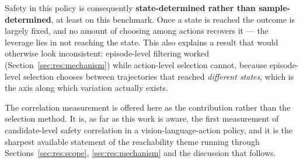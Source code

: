 Safety in this policy is consequently \textbf{state-determined rather than sample-determined}, at
least on this benchmark. Once a state is reached the outcome is largely fixed, and no amount of
choosing among actions recovers it --- the leverage lies in not reaching the state. This also
explains a result that would otherwise look inconsistent: episode-level filtering worked
(Section~\ref{sec:res:mechanism}) while action-level selection cannot, because episode-level
selection chooses between trajectories that reached \emph{different states}, which is the axis
along which variation actually exists.

The correlation measurement is offered here as the contribution rather than the selection method.
It is, as far as this work is aware, the first measurement of candidate-level safety correlation in
a vision-language-action policy, and it is the sharpest available statement of the reachability
theme running through Sections~\ref{sec:res:scope}, \ref{sec:res:mechanism} and the discussion that
follows.
